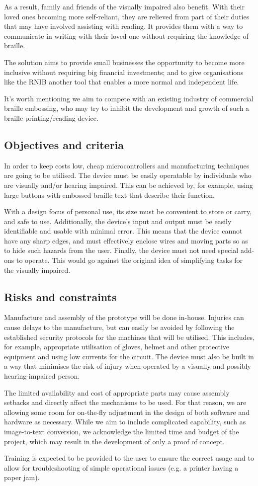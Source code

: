 As a result, family and friends of the visually impaired also benefit.
With their loved ones becoming more self-reliant, they are relieved from part of their duties that may have involved assisting with reading.
It provides them with a way to communicate in writing with their loved one without requiring the knowledge of braille.

The solution aims to provide small businesses the opportunity to become more inclusive without requiring big financial investments; and to give organisations like the RNIB another tool that enables a more normal and independent life.

It's worth mentioning we aim to compete with an existing industry of commercial braille embossing, who may try to inhibit the development and growth of such a braille printing/reading device.

\subsection{Objectives and criteria}
In order to keep costs low, cheap microcontrollers and manufacturing techniques are going to be utilised.
The device must be easily operatable by individuals who are visually and/or hearing impaired.
This can be achieved by, for example, using large buttons with embossed braille text that describe their function.

With a design focus of personal use, its size must be convenient to store or carry, and safe to use.
Additionally, the device's input and output must be easily identifiable and usable with minimal error.
This means that the device cannot have any sharp edges, and must effectively enclose wires and moving parts so as to hide such hazards from the user.
Finally, the device must not need special add-ons to operate.
This would go against the original idea of simplifying tasks for the visually impaired.
 

\subsection{Risks and constraints}
Manufacture and assembly of the prototype will be done in-house.
Injuries can cause delays to the manufacture, but can easily be avoided by following the established security protocols for the machines that will be utilised.
This includes, for example, appropriate utilisation of gloves, helmet and other protective equipment and using low currents for the circuit.
The device must also be built in a way that minimises the risk of injury when operated by a visually and possibly hearing-impaired person.

The limited availability and cost of appropriate parts may cause assembly setbacks and directly affect the mechanisms to be used.
For that reason, we are allowing some room for on-the-fly adjustment in the design of both software and hardware as necessary.
While we aim to include complicated capability, such as image-to-text conversion, we acknowledge the limited time and budget of the project, which may result in the development of only a proof of concept.

Training is expected to be provided to the user to ensure the correct usage and to allow for troubleshooting of simple operational issues (e.g. a printer having a paper jam).